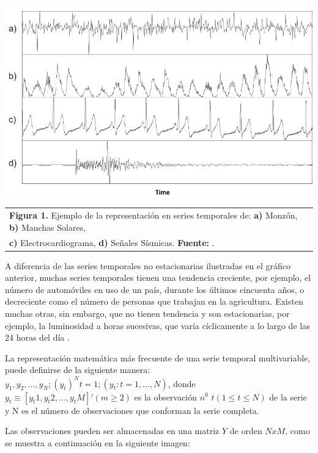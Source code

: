 \begin{center}
\includegraphics[scale=0.7]{timeSeries.png}
\vspace*{10pt}
\footnotesize{
\begin{tabular}{l}
\textbf{Figura 1.} Ejemplo de la representaci\'on en series temporales de: \textbf{a)} Monz\'on, \textbf{b)} Manchas Solares,\\ \textbf{c)} Electrocardiograma, \textbf{d)} Se\~nales S\'ismicas. \textbf{Fuente:} \cite{concepts}.
\end{tabular}}
\end{center}
A diferencia de las series temporales no estacionarias ilustradas en el gr\'afico anterior, muchas series temporales tienen una tendencia creciente, por ejemplo, el n\'umero de autom\'oviles en uso de un pa\'is, durante los \'ultimos cincuenta a\~nos, o decreciente como el n\'umero de personas que trabajan en la agricultura. Existen muchas otras, sin embargo, que no tienen tendencia y son estacionarias, por ejemplo, la luminosidad a horas sucesivas, que var\'ia c\'iclicamente a lo largo de las 24 horas del d\'ia \cite{concepts}.\par
La representaci\'on matem\'atica m\'as frecuente de una serie temporal multivariable, puede definirse de la siguiente manera:\\
$y_1, y_2,...,y_N; (y_t)^N t=1; (y_t: t=1,...,N)$, donde $y_t \equiv [y_t1, y_t2,...,y_tM]' (m \geq 2)$ es la observaci\'on $n^0$ $t(1 \leq t \leq N)$ de la serie y N es el n\'umero de observaciones que conforman la serie completa.\par
Las observaciones pueden ser almacenadas en una matriz $Y$ de orden $N x M$, como se muestra a continuaci\'on en la siguiente imagen:\\

